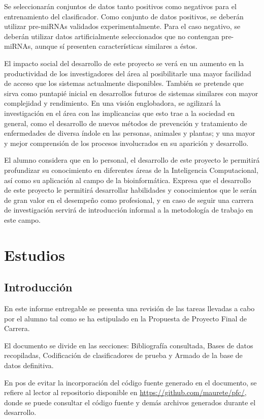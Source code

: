 \documentclass[12pt,bibliography=oldstyle,DIV=12,parskip=half-]{scrreprt}
\begin{document}
Se seleccionarán conjuntos de datos tanto positivos como negativos
para el entrenamiento del clasificador. Como conjunto de datos
positivos, se deberán utilizar pre-miRNAs validados experimentalmente.
Para el caso negativo, se deberán utilizar datos artificialmente
seleccionados que no contengan pre-miRNAs, aunque sí presenten
características similares a éstos.

El impacto social del desarrollo de este proyecto se verá en un
aumento en la productividad de los investigadores del área al
posibilitarle una mayor facilidad de acceso que los sistemas actualmente
disponibles. También se pretende que sirva como puntapié inicial en
desarrollos futuros de sistemas similares con mayor complejidad y
rendimiento. En una visión englobadora, se agilizará la investigación
en el área con las implicancias que esto trae a la sociedad en
general, como el desarrollo de nuevos métodos de prevención y
tratamiento de enfermedades de diversa índole en las personas,
animales y plantas; y una mayor y mejor comprensión de los procesos
involucrados en su aparición y desarrollo.

El alumno considera que en lo personal, el desarrollo de este proyecto
le permitirá profundizar su conocimiento en diferentes áreas de la
Inteligencia Computacional, así como su aplicación al campo de la
bioinformática. Expresa que el desarrollo de este proyecto le
permitirá desarrollar habilidades y conocimientos que le serán de gran
valor en el desempeño como profesional, y en caso de seguir una
carrera de investigación servirá de introducción informal a la
metodología de trabajo en este campo.
%
%
%
\chapter{Estudios}
%
%
\section{Introducción}
En este informe entregable se presenta una revisión de las tareas
llevadas a cabo por el alumno tal como se ha estipulado en la
Propuesta de Proyecto Final de Carrera.

El documento se divide en las secciones: Bibliografía consultada,
Bases de datos recopiladas, Codificación de clasificadores de prueba
y Armado de la base de datos definitiva.

En pos de evitar la incorporación del código fuente generado en el
documento, se refiere al lector al repositorio disponible en
\url{https://github.com/maurete/pfc/}, donde se puede consultar
el código fuente y demás archivos generados durante el desarrollo.
%
%
%
%
\end{document}
